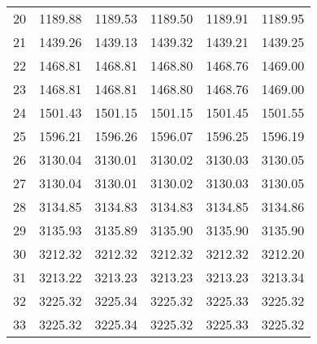\documentclass[10pt,oneside]{article}
\begin{document}
\begin{table}[h!]
\begin{tabular}{cccccc}
20 &   1189.88 & 1189.53 &    1189.50 & 1189.91 &   1189.95 \\
21 &   1439.26 & 1439.13 &    1439.32 & 1439.21 &   1439.25 \\
22 &   1468.81 & 1468.81 &    1468.80 & 1468.76 &   1469.00 \\
23 &   1468.81 & 1468.81 &    1468.80 & 1468.76 &   1469.00 \\
24 &   1501.43 & 1501.15 &    1501.15 & 1501.45 &   1501.55 \\
25 &   1596.21 & 1596.26 &    1596.07 & 1596.25 &   1596.19 \\
26 &   3130.04 & 3130.01 &    3130.02 & 3130.03 &   3130.05 \\
27 &   3130.04 & 3130.01 &    3130.02 & 3130.03 &   3130.05 \\
28 &   3134.85 & 3134.83 &    3134.83 & 3134.85 &   3134.86 \\
29 &   3135.93 & 3135.89 &    3135.90 & 3135.90 &   3135.90 \\
30 &   3212.32 & 3212.32 &    3212.32 & 3212.32 &   3212.20 \\
31 &   3213.22 & 3213.23 &    3213.23 & 3213.23 &   3213.34 \\
32 &   3225.32 & 3225.34 &    3225.32 & 3225.33 &   3225.32 \\
33 &   3225.32 & 3225.34 &    3225.32 & 3225.33 &   3225.32 \\
\bottomrule
\end{tabular}
\end{table}
\end{document}
